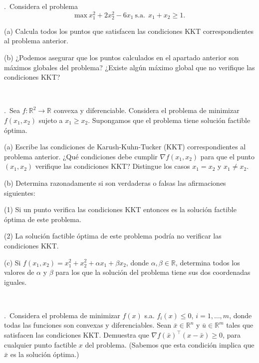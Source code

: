\documentclass[12pt,a4paper,twoside]{article}
\newcounter{problem} \setcounter{problem}{1}
\newcommand{\ex}{\noindent {\sf \bf \theproblem}\addtocounter{problem}{1}.\ }
\begin{document}
\ex Considera el problema 
\[
\mbox{max}\ x^2_1+2x^2_2-6x_1 \ \mbox{s.a.}\ \ x_1+x_2\geq 1.
\]
\begin{compactitem}
\item[(a)] Calcula todos los puntos que satisfacen las condiciones KKT correspondientes al problema anterior.
\item[(b)] ¿Podemos asegurar que los puntos calculados en el apartado anterior son máximos globales del problema? ¿Existe algún máximo global que no verifique las condiciones KKT?
\end{compactitem}


\


\ex Sea $f:\mathbb{R}^2\to\mathbb{R}$ convexa y diferenciable. Considera el problema de minimizar $f(x_1,x_2)$ sujeto a $x_1\geq x_2$. Supongamos que el problema tiene solución factible óptima.
\begin{compactitem}
\item[(a)] Escribe las condiciones de Karush-Kuhn-Tucker (KKT) correspondientes al problema anterior. ¿Qué condiciones debe cumplir $\nabla f(x_1,x_2)$ para que el punto $(x_1,x_2)$ verifique las condiciones KKT? Distingue los casos $x_1=x_2$ y $x_1\neq x_2$.
\item[(b)] Determina razonadamente si son verdaderas o falsas las  afirmaciones siguientes: 
	\begin{compactitem}
		\item[(1)] Si un punto verifica las condiciones KKT entonces es la solución factible óptima de este problema.
		\item[(2)] La solución factible óptima de este problema podría no verificar las condiciones KKT.
	\end{compactitem}
\item[(c)] Si $f(x_1,x_2)=x_1^2+x_2^2+\alpha x_1 + \beta x_2$, donde $\alpha,\beta\in\mathbb{R}$, determina todos los valores de $\alpha$ y $\beta$ para los que la solución del problema tiene sus dos coordenadas iguales. 
\end{compactitem}



\

\ex Considera el problema de minimizar $f(x)$ s.a. $f_i(x)\leq 0$, $i=1,\ldots,m$, donde todas las funciones son convexas y diferenciables. Sean $\bar{x}\in\mathbb{R}^n$ y $\bar{u}\in\mathbb{R}^m$ tales que satisfacen las condiciones KKT. Demuestra que $\nabla f(\bar{x})^\top (x-\bar{x})\geq 0$, para cualquier punto factible $x$ del problema. (Sabemos que esta condición implica que $\bar{x}$ es la solución óptima.)
\end{document}
